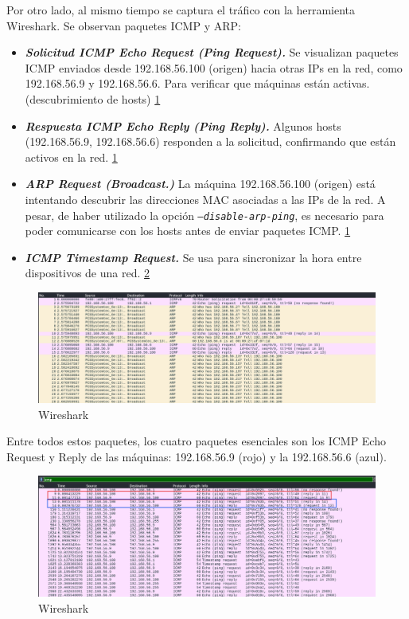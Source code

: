 \documentclass[a4paper,12pt]{article} %
\begin{document}
        \newpage
        Por otro lado, al mismo tiempo se captura el tráfico con la herramienta Wireshark. Se observan paquetes ICMP y ARP:
            \begin{itemize}
                \item \textbf{\textit{Solicitud ICMP Echo Request (Ping Request).}}  Se visualizan paquetes ICMP enviados desde 192.168.56.100 (origen) hacia otras IPs en la red, como 192.168.56.9 y 192.168.56.6. Para verificar que máquinas están activas. (descubrimiento de hosts) \ref{fig:wire1}
                \item \textbf{\textit{Respuesta ICMP Echo Reply (Ping Reply). }} Algunos hosts (192.168.56.9, 192.168.56.6) responden a la solicitud, confirmando que están activos en la red. \ref{fig:wire1}
                \item \textbf{\textit{ARP Request (Broadcast.)}} La máquina 192.168.56.100 (origen) está intentando descubrir las direcciones MAC asociadas a las IPs de la red. A pesar, de haber utilizado la opción \textit{\texttt{--disable-arp-ping}}, es necesario para poder comunicarse con los hosts antes de enviar paquetes ICMP. \ref{fig:wire1}
                \item \textbf{\textit{ICMP Timestamp Request.}} Se usa para sincronizar la hora entre dispositivos de una red. \ref{fig:wire2}
            \end{itemize}
        \begin{figure} [hp!]
         \centering
         \includegraphics[width=1\textwidth]{Imagenes/wireshark-eje1.png}
         \caption{Wireshark}
         \label{fig:wire1}
        \end{figure}
        Entre todos estos paquetes, los cuatro paquetes esenciales son los ICMP Echo Request y Reply de las máquinas: 192.168.56.9 (rojo) y la 192.168.56.6 (azul). 
        \begin{figure} [hp!]
         \centering
         \includegraphics[width=1\textwidth]{Imagenes/icmp.png}
         \caption{Wireshark}
         \label{fig:wire2}
        \end{figure}
\end{document}
